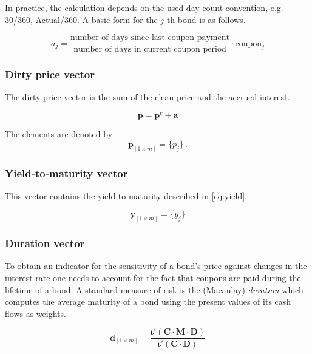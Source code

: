 In practice, the calculation depends on the used day-count convention, e.g. 30/360, Actual/360. A basic form for the $j$-th bond is as follows.

\begin{equation*}
    a_j= \frac{\mbox{number of days since last coupon payment}}{\mbox{number of days in current coupon period}}\cdot \mbox{coupon}_j
\end{equation*}
 	

\subsubsection*{Dirty price vector}

The dirty price vector is the sum of the clean price and the accrued interest.

\begin{displaymath}
\bm{p}=\bm{p}^c+\bm{a}
\end{displaymath}

The elements are denoted by 
\begin{equation*}\label{pd}
    \bm{p}_{\left[1\times m\right]}= \{p_j\}\,.
\end{equation*}


\subsubsection*{Yield-to-maturity vector}

This vector contains the yield-to-maturity described in \eqref{eq:yield}.

\begin{equation*}\label{pd}
    \bm{y}_{\left[1\times m\right]}= \{y_j\}
\end{equation*}



\subsubsection*{Duration vector}

To obtain an indicator for the sensitivity of a bond's price against changes in the interest rate one needs to account for the fact that coupons are paid during the lifetime of a bond. A standard measure of risk is the (Macaulay) \emph{duration} which computes the average maturity of a bond using the present values of its cash flows as weights.



\begin{equation*}
  \label{eq:macaulayduration}
  \bm{d}_{\left[1\times m\right]} = \frac{\bm{\iota}'(\bm{C}\cdot\bm{M}\cdot\bm{D})}{\bm{\iota}'(\bm{C}\cdot\bm{D})}
\end{equation*}

